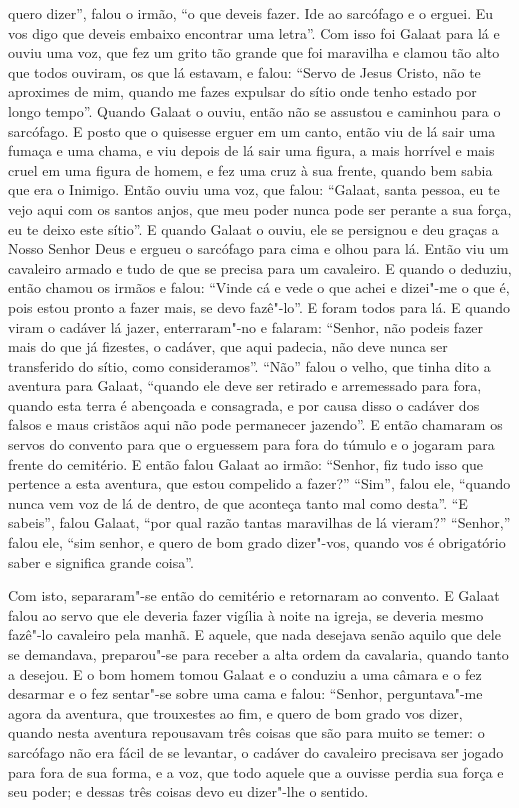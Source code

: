 quero dizer”, falou o irmão, “o que deveis fazer. Ide ao sarcófago e o erguei.
Eu vos digo que deveis embaixo encontrar uma letra”. Com isso foi
Galaat para lá e ouviu uma voz, que fez um grito tão grande que foi maravilha e
clamou tão alto que todos ouviram, os que lá estavam, e falou: “Servo de Jesus
Cristo, não te aproximes de mim, quando me fazes expulsar do sítio onde tenho
estado por longo tempo”. Quando Galaat o ouviu,  então não se assustou e
caminhou para o sarcófago. E posto que o quisesse  erguer em um canto, então
viu de lá sair uma fumaça e uma chama, e viu depois de lá sair uma figura, a
mais horrível e mais cruel em uma figura de homem, e fez uma cruz à sua frente,
quando bem sabia que era o Inimigo. Então ouviu uma voz, que falou: “Galaat,
santa pessoa, eu te vejo aqui com os santos anjos, que meu poder nunca pode ser
perante a sua força, eu te deixo este sítio”. E quando Galaat o ouviu, ele se
persignou e deu graças a Nosso Senhor Deus e ergueu o sarcófago para cima e
olhou para lá. Então viu um cavaleiro armado e tudo de que se precisa
para um cavaleiro. E quando o deduziu, então chamou os irmãos e falou: “Vinde
cá e vede o que achei e dizei"-me o que é, pois estou pronto a fazer mais, se
devo fazê"-lo”.  E foram todos para lá. E quando viram o cadáver lá
jazer, enterraram"-no e falaram: “Senhor, não podeis fazer mais do que já
fizestes, o cadáver, que aqui padecia, não deve nunca ser transferido do sítio,
como consideramos”. “Não” falou o velho, que tinha dito a aventura para Galaat,
“quando ele deve ser retirado e arremessado para fora, quando esta terra é
abençoada e consagrada, e por causa disso o cadáver dos falsos e maus cristãos
aqui não pode permanecer jazendo”. E então chamaram os servos do
convento para que o erguessem para fora do túmulo e o jogaram para frente do
cemitério. E então falou Galaat ao irmão: “Senhor, fiz tudo isso que pertence a
esta aventura, que estou compelido a fazer?” “Sim”, falou ele, “quando nunca
vem voz de lá de dentro, de que aconteça tanto mal como desta”. “E
sabeis”, falou Galaat, “por qual razão tantas maravilhas de lá vieram?”
“Senhor,” falou ele, “sim senhor, e quero de bom grado dizer"-vos, quando vos é
obrigatório saber e significa grande coisa”.

Com isto, separaram"-se então do cemitério e retornaram ao convento. E Galaat
falou ao servo que ele deveria fazer vigília à noite na igreja, se deveria
mesmo fazê"-lo cavaleiro pela manhã. E aquele, que nada desejava senão aquilo
que dele se demandava, preparou"-se para receber a alta ordem da cavalaria,
quando tanto a desejou. E o bom homem tomou Galaat e o conduziu a uma
câmara e o fez desarmar e o fez sentar"-se sobre uma cama e falou: “Senhor,
perguntava"-me agora da aventura, que trouxestes ao fim, e quero de bom grado
vos dizer, quando nesta aventura repousavam três coisas que são para muito se
temer: o sarcófago não era fácil de se levantar, o cadáver do cavaleiro
precisava ser jogado para fora de sua forma, e a voz, que todo aquele que a
ouvisse perdia sua força e seu poder; e dessas três coisas devo eu dizer"-lhe o
sentido. 

